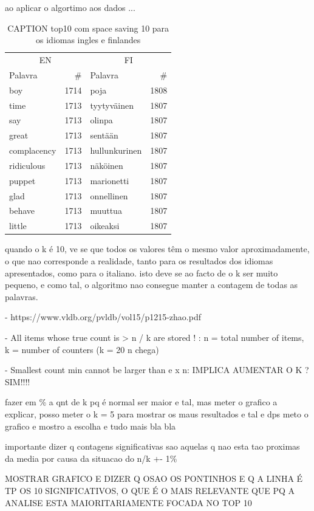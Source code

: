 \documentclass[mirror, portugues]{revdetua}
\begin{document}
ao aplicar o algortimo aos dados ...

\begin{table}[H]
\centering
\caption{CAPTION top10 com space saving 10 para os idiomas ingles e finlandes}
\label{table:top10_ss10}
\begin{tabular}{lr|lr}
\toprule
\multicolumn{2}{c}{EN} & \multicolumn{2}{c}{FI} \\
Palavra & \# & Palavra & \# \\
\midrule
boy & 1714 & poja & 1808 \\
time & 1713 & tyytyväinen & 1807 \\
say & 1713 & olinpa & 1807 \\
great & 1713 & sentään & 1807 \\
complacency & 1713 & hullunkurinen & 1807 \\
ridiculous & 1713 & näköinen & 1807 \\
puppet & 1713 & marionetti & 1807 \\
glad & 1713 & onnellinen & 1807 \\
behave & 1713 & muuttua & 1807 \\
little & 1713 & oikeaksi & 1807 \\
\bottomrule
\end{tabular}
\end{table}



quando o k é 10, ve se que todos os valores têm o mesmo valor aproximadamente, o que nao corresponde a realidade, tanto para os resultados dos idiomas apresentados, como para o italiano. isto deve se ao facto de o k ser muito pequeno, e como tal, o algoritmo nao consegue manter a contagem de todas as palavras.


- https://www.vldb.org/pvldb/vol15/p1215-zhao.pdf

- All items whose true count is > n / k are stored ! : n = total number of items, k = number of counters (k = 20 n chega)

- Smallest count min cannot be larger than e x n: IMPLICA AUMENTAR O K ? SIM!!!!

fazer em \% a qnt de k pq é normal ser maior e tal, mas meter o grafico a explicar, posso meter o k = 5 para mostrar os maus resultados e tal e dps meto o grafico e mostro a escolha e tudo mais bla bla

importante dizer q contagens significativas sao aquelas q nao esta tao proximas da media por causa da situacao do n/k +- 1\%

MOSTRAR GRAFICO E DIZER Q OSAO OS PONTINHOS E Q A LINHA É TP OS 10 SIGNIFICATIVOS, O QUE É O MAIS RELEVANTE QUE PQ A ANALISE ESTA MAIORITARIAMENTE FOCADA NO TOP 10
\end{document}
